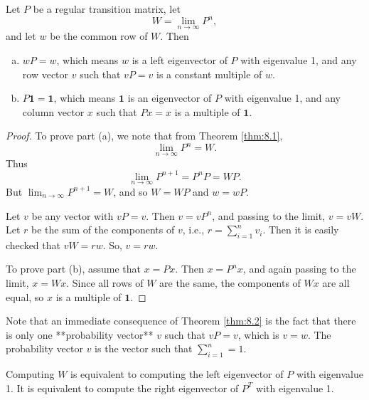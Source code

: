 \begin{theorem}
\label{thm:8.2}
Let $P$ be a regular transition matrix, let
\begin{equation*}
    W = \lim_{n\to\infty} P^n,
\end{equation*}
and let $w$ be the common row of $W$. Then
\begin{enumerate}[(a)]
    \item 
    $wP = w$, which means $w$ is a left eigenvector of $P$ with eigenvalue 1, and any row vector $v$ such that $vP = v$ is a constant multiple of $w$.
    
    \item 
    $P\mathbf{1} = \mathbf{1}$, which means $\mathbf{1}$ is an eigenvector of $P$ with eigenvalue 1, and any column vector $x$ such that $Px = x$ is a multiple of $\mathbf{1}$.
\end{enumerate}
\end{theorem}

\begin{proof}
To prove part (a), we note that from Theorem \ref{thm:8.1}, 
\begin{equation*}
    \lim_{n\to\infty} P^n = W.
\end{equation*}
Thus
\begin{equation*}
    \lim_{n\to\infty} P^{n+1} = P^n P = W P.
\end{equation*}
But $\lim_{n\to\infty} P^{n+1} = W$, and so $W = WP$ and $w = wP$.

Let $v$ be any vector with $vP = v$. Then $v = vP^n$, and passing to the limit, $v = vW$. Let $r$ be the sum of the components of $v$, i.e., $r = \sum_{i=1}^n v_i$. Then it is easily checked that $vW = rw$. So, $v = rw$.

To prove part (b), assume that $x = Px$. Then $x = P^n x$, and again passing to the limit, $x = Wx$. Since all rows of $W$ are the same, the components of $Wx$ are all equal, so $x$ is a multiple of $\mathbf{1}$.
\end{proof}

Note that an immediate consequence of Theorem \ref{thm:8.2} is the fact that there is only one **probability vector** $v$ such that $vP = v$, which is $v = w$. The probability vector $v$ is the vector such that $\sum_{i=1}^n = 1$.

\begin{remark}
Computing $W$ is equivalent to computing the left eigenvector of $P$ with eigenvalue 1. It is equivalent to compute the right eigenvector of $P^T$ with eigenvalue 1.
\end{remark}

